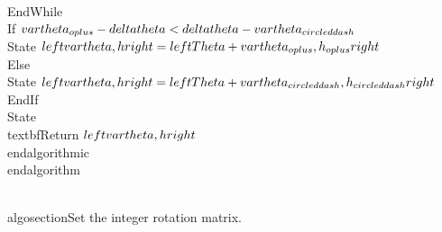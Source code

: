  \\EndWhile
  \\If{ $\\vartheta_{\\oplus} -\\delta\\theta < \\delta\\theta - \\vartheta_{\\circleddash}$ }
 \\State  $\\left\\{ \\vartheta, h\\right\\}  = \\left\\{\\Theta + \\vartheta_{\\oplus}, h_{\\oplus}\\right\\}  $ 
 \\Else
  \\State $\\left\\{ \\vartheta, h\\right\\}  = \\left\\{\\Theta + \\vartheta_{\\circleddash}, h_{\\circleddash}\\right\\} $
  \\EndIf
 \\State \\textbf{Return} {$\\left\\{ \\vartheta, h\\right\\} $ }
  \\end{algorithmic}
 \\end{algorithm}
 

\\algosection{Set the integer rotation matrix.} 

